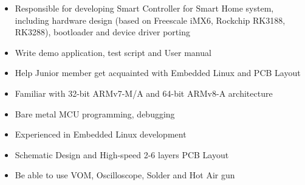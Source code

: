 \documentclass[12pt,a4paper]{altacv}
\begin{document}
\divider

\begin{itemize}
\item Responsible for developing Smart Controller for Smart Home system, including hardware design (based on Freescale iMX6, Rockchip RK3188, RK3288), bootloader and device driver porting %
\item Write demo application, test script and User manual
\item Help Junior member get acquainted with Embedded Linux and PCB Layout
\end{itemize}


\begin{itemize}
\item Familiar with 32-bit ARMv7-M/A and 64-bit ARMv8-A architecture
\item Bare metal MCU programming, debugging
\item Experienced in Embedded Linux development
\item Schematic Design and High-speed 2-6 layers PCB Layout
\item Be able to use VOM, Oscilloscope, Solder and Hot Air gun
\end{itemize}

\divider


\end{document}
